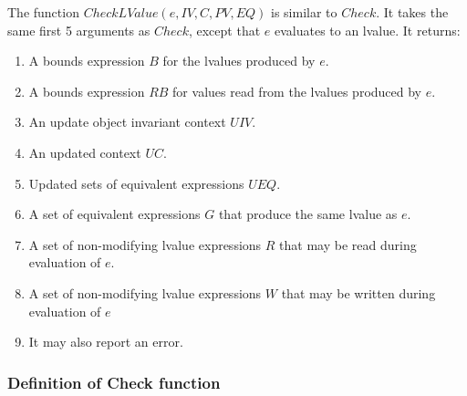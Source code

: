 The function $CheckLValue(e, IV, C, PV, EQ)$ is similar to $Check$.  It takes the
same first 5 arguments as $Check$, except that $e$ evaluates to an lvalue.
It returns:
\begin{enumerate}
\item A bounds expression $B$ for the lvalues produced by $e$.
\item A bounds expression $RB$ for values read from the lvalues produced by $e$.
\item An update object invariant context $UIV$.
\item An updated context $\mathit{UC}$.
\item Updated sets of equivalent expressions $UEQ$.
\item A set of equivalent expressions $G$ that produce the same lvalue as $e$.
\item A set of non-modifying lvalue expressions $R$ that may be read during evaluation of $e$.
\item A set of non-modifying lvalue expressions $W$ that may be written during evaluation of $e$
\item It may also report an error.
\end{enumerate}

\subsubsection{Definition of Check function}

%
%
%
%

